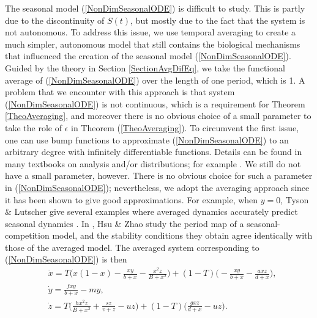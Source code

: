 \documentclass[12pt]{UOthesis}
\theoremstyle{remarkstyle}
\begin{document}
The seasonal model (\ref{NonDimSeasonalODE}) is difficult to study. This is partly due to the discontinuity of $S(t)$, but mostly due to the fact that the system is not autonomous. To address this issue, we use temporal averaging to create a much simpler, autonomous model that still contains the biological mechanisms that influenced the creation of the seasonal model (\ref{NonDimSeasonalODE}). Guided by the theory in Section \ref{SectionAvgDifEq}, we take the functional average of (\ref{NonDimSeasonalODE}) over the length of one period, which is 1. A problem that we encounter with this approach is that system (\ref{NonDimSeasonalODE}) is not continuous, which is a requirement for Theorem \ref{TheoAveraging}, and moreover there is no obvious choice of a small parameter to take the role of $\epsilon$ in Theorem (\ref{TheoAveraging}). To circumvent the first issue, one can use bump functions to approximate (\ref{NonDimSeasonalODE}) to an arbitrary degree with infinitely differentiable functions. Details can be found in many textbooks on analysis and/or distributions; for example \cite{Grubb}. We still do not have a small parameter, however. There is no obvious choice for such a parameter in (\ref{NonDimSeasonalODE}); nevertheless, we adopt the averaging approach since it has been shown to give good approximations. For example, when $y=0$, Tyson \& Lutscher give several examples where averaged dynamics accurately predict seasonal dynamics \cite{TysonLutscher}. In \cite{HsuZhao}, Hsu \& Zhao study the period map of a seasonal-competition model, and the stability conditions they obtain agree identically with those of the averaged model. The averaged system corresponding to (\ref{NonDimSeasonalODE}) is then
\begin{equation}
\begin{split}
&\dot{x}=T\Big(x(1-x)-\frac{xy}{b+x}-\frac{x^2 z}{B+x^2}\Big)+(1-T)\Big(-\frac{xy}{b+x}-\frac{axz}{d+x}\Big),\\
&\dot{y}=\frac{fxy}{b+x}-my,\\
&\dot{z}=T\Big(\frac{hx^2z}{B+x^2}+\frac{sz}{v+z}-uz\Big)+(1-T)\Big(\frac{gxz}{d+x}-uz\Big).
\end{split}
\label{HLO}
\end{equation}
\end{document}
